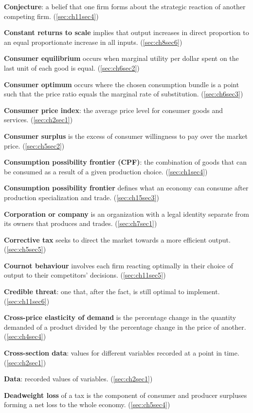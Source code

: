 \textbf{Conjecture}: a belief that one firm forms about the strategic reaction of another competing firm. (\ref{sec:ch11sec4})

\textbf{Constant returns to scale} implies that output increases in direct proportion to an equal proportionate increase in all inputs. (\ref{sec:ch8sec6})

\textbf{Consumer equilibrium} occurs when marginal utility per dollar spent on the last unit of each good is equal. (\ref{sec:ch6sec2})

\textbf{Consumer optimum} occurs where the chosen consumption bundle is a point such that the price ratio equals the marginal rate of substitution. (\ref{sec:ch6sec3})

\textbf{Consumer price index}: the average price level for consumer goods and services. (\ref{sec:ch2sec1})

\textbf{Consumer surplus} is the excess of consumer willingness to pay over the market price. (\ref{sec:ch5sec2})

\textbf{Consumption possibility frontier (CPF)}: the combination of goods that can be consumed as a result of a given production choice. (\ref{sec:ch1sec4})

\textbf{Consumption possibility frontier} defines what an economy can consume after production specialization and trade. (\ref{sec:ch15sec3})

\textbf{Corporation or company} is an organization with a legal identity separate from its owners that produces and trades. (\ref{sec:ch7sec1})

\textbf{Corrective tax} seeks to direct the market towards a more efficient output. (\ref{sec:ch5sec5})

\textbf{Cournot behaviour} involves each firm reacting optimally in their choice of output to their competitors' decisions. (\ref{sec:ch11sec5})

\textbf{Credible threat}: one that, after the fact, is still optimal to implement. (\ref{sec:ch11sec6})

\textbf{Cross-price elasticity of demand} is the percentage change in the quantity demanded of a product divided by the percentage change in the price of another. (\ref{sec:ch4sec4})

\textbf{Cross-section data}: values for different variables recorded at a point in time. (\ref{sec:ch2sec1})

\textbf{Data}: recorded values of variables. (\ref{sec:ch2sec1})

\textbf{Deadweight loss} of a tax is the component of consumer and producer surpluses forming a net loss to the whole economy. (\ref{sec:ch5sec4})

